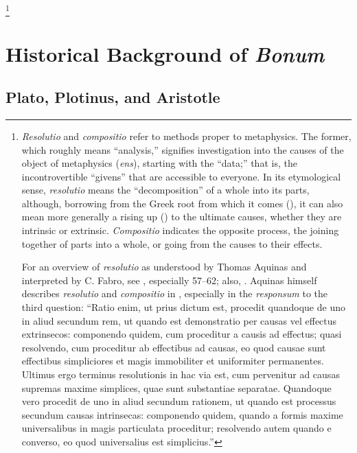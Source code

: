 \footnote{\emph{Resolutio} and \emph{compositio} refer to methods proper to metaphysics. The former, which roughly means ``analysis,'' signifies investigation into the causes of the object of metaphysics (\emph{ens}), starting with the ``data;'' that is, the incontrovertible ``givens'' that are accessible to everyone. In its etymological sense, \emph{resolutio} means the ``decomposition'' of a whole into its parts, although, borrowing from the Greek root from which it comes (), it can also mean more generally a rising up () to the ultimate causes, whether they are intrinsic or extrinsic.  \emph{Compositio} indicates the opposite process, the joining together of parts into a whole, or going from the causes to their effects.

For an overview of \emph{resolutio} as understood by Thomas Aquinas and interpreted by C. Fabro, see \cite{villagrasa:resolutio}, especially 57--62; also, \cite[339--359]{mitchell:resolutio}. Aquinas himself describes \emph{resolutio} and \emph{compositio} in \cite[q.~6, a.~1]{st:detrinitate}, especially in the \emph{responsum} to the third question: ``Ratio enim, ut prius dictum est, procedit quandoque de uno in aliud secundum rem, ut quando est demonstratio per causas vel effectus extrinsecos: componendo quidem, cum proceditur a causis ad effectus; quasi resolvendo, cum proceditur ab effectibus ad causas, eo quod causae sunt effectibus simpliciores et magis immobiliter et uniformiter permanentes. Ultimus ergo terminus resolutionis in hac via est, cum pervenitur ad causas supremas maxime simplices, quae sunt substantiae separatae. Quandoque vero procedit de uno in aliud secundum rationem, ut quando est processus secundum causas intrinsecas: componendo quidem, quando a formis maxime universalibus in magis particulata proceditur; resolvendo autem quando e converso, eo quod universalius est simplicius.''}
%

\section{Historical Background of \emph{Bonum}}
\subsection{Plato, Plotinus, and Aristotle}

